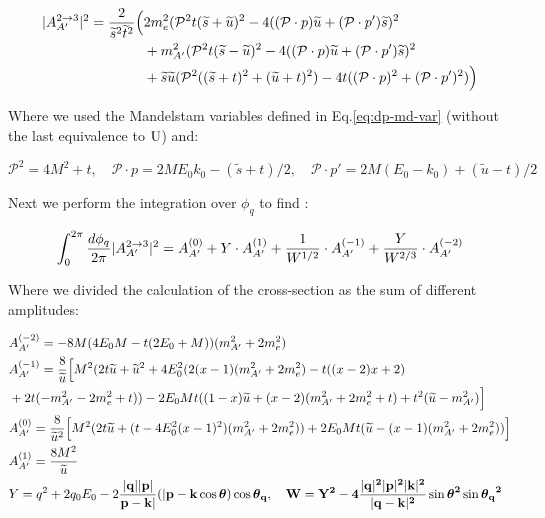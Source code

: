 \begin{equation}
  \label{eq:cs-dp-amp}
  \begin{aligned}
    |A^{2 \to 3}_{A'}|^2 = \frac{2}{\widetilde{s}^2\widetilde{t}^2} \Big( &2m^2_e (\mathcal{P}^2 t (\widetilde{s} + \widetilde{u})^2 - 4((\mathcal{P} \cdot p)\widetilde{u} + (\mathcal{P} \cdot p')\widetilde{s})^2  \\
      &+ m^2_{A'}(\mathcal{P}^2 t (\widetilde{s} - \widetilde{u})^2 -4((\mathcal{P}\cdot p)\widetilde{u} + (\mathcal{P}\cdot p')\widetilde{s})^2 \\
      &+ \widetilde{s}\widetilde{u}(\mathcal{P}^2 ((\widetilde{s} + t)^2 + (\widetilde{u}+t)^2) - 4 t ((\mathcal{P} \cdot p)^2 + (\mathcal{P} \cdot p')^2) \Big)
  \end{aligned}    
\end{equation}

Where we used the Mandelstam variables defined in Eq.\ref{eq:dp-md-var} (without the last equivalence to $\rm{U}$) and:

\begin{equation}
  \label{eq:dp-md-var-2}
  \mathcal{P}^2 = 4M^2 + t, \quad \mathcal{P} \cdot p = 2 M E_0 k_0 - (\widetilde{s} + t)/2, \quad \mathcal{P} \cdot p' = 2 M (E_0 - k_0) + (\widetilde{u} - t)/2
\end{equation}

Next we perform the integration over $\phi_q$ to find \cite{DMsimulation}:

\begin{equation}
  \label{eq:dp-cs-tl-int}
  \int_0^{2\pi} \frac{d\phi_q}{2\pi} |A^{2 \to 3}_{A'}|^2 = A^{(0)}_{A'} + Y \cdot A^{(1)}_{A'} + \frac{1}{W^{1/2}} \cdot A^{(-1)}_{A'} + \frac{Y}{W^{2/3}} \cdot A^{(-2)}_{A'}
\end{equation}

Where we divided the calculation of the cross-section as the sum of different amplitudes:

\begin{equation}
  \label{eq:dp-cs-tl-par}
  \begin{aligned}
    &A^{(-2)}_{A'} = -8M (4E_0M - t(2E_0 + M ))(m^2_{A'} + 2m^2_e)\\
    &A^{(-1)}_{A'} = \frac{8}{\widetilde{u}} \Big[ M^2 (2t\widetilde{u} + \widetilde{u}^2 + 4E_0^2 (2(x-1)(m^2_{A'} + 2m_e^2) - t((x-2)x + 2)\\
    &+ 2t(-m^2_{A'} - 2m_e^2 + t)) - 2E_0 M t ((1-x)\widetilde{u} + (x-2)(m^2_{A'} + 2m^2_e + t) + t^2 (\widetilde{u} - m^2_{A'}) \Big] \\
    &A^{(0)}_{A'} = \frac{8}{\widetilde{u}^2} \Big[ M^2 (2t\widetilde{u} + (t - 4E_0^2(x-1)^2)(m^2_{A'} + 2m^2_e)) + 2E_0M t (\widetilde{u} - (x-1)(m^2_{A'} + 2m^2_e)) \Big] \\
    &A^{(1)}_{A'} = \frac{8M^2}{\widetilde{u}} \\
    &Y = q^2 + 2q_0 E_0 - 2 \frac{|\bf{q}| |\bf{p}|}{\bf{p} - \bf{k}|} (|\bf{p} - \bf{k} \cos{\boldsymbol{\theta}})\cos{\boldsymbol{\theta}_q}, \quad W = Y^2 - 4 \frac{|\bf{q}|^2|\bf{p}|^2|\bf{k}|^2}{|\bf{q} - \bf{k}|^2} \sin{\boldsymbol{\theta}}^2\sin{\boldsymbol{\theta}_q}^2
  \end{aligned}
\end{equation}

